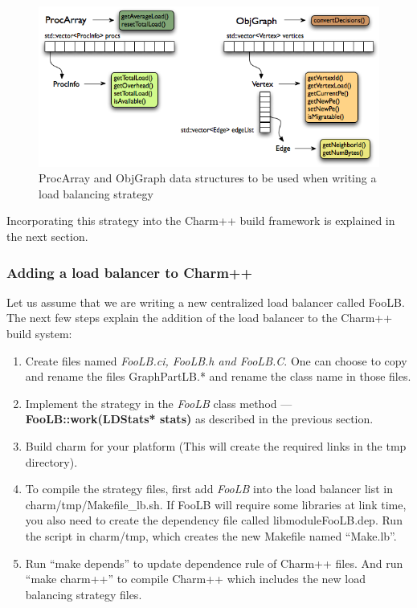 \begin{figure}[h]
\centering
\includegraphics[width=6.0in]{fig/ckgraph}
\caption{ProcArray and ObjGraph data structures to be used when writing a load
balancing strategy}
\label{fig:ckgraph}
\end{figure}

Incorporating this strategy into the Charm++ build framework is explained in
the next section.

\subsubsection{Adding a load balancer to Charm++}

Let us assume that we are writing a new centralized load balancer called FooLB.
The next few steps explain the addition of the load balancer to the Charm++
build system:

\begin{enumerate}
\item Create files named {\em FooLB.ci, FooLB.h and FooLB.C}. One can choose to
copy and rename the files GraphPartLB.* and rename the class name in those
files.

\item Implement the strategy in the {\em FooLB} class method --- {\bf
FooLB::work(LDStats* stats)} as described in the previous section.

\item Build charm for your platform (This will create the required links in the
tmp directory).

\item To compile the strategy files, first add {\em FooLB} into the load
balancer list in charm/tmp/Makefile\_lb.sh. If FooLB will require some
libraries at link time, you also need to create the dependency file called
libmoduleFooLB.dep. Run the script in charm/tmp, which creates the new Makefile
named ``Make.lb''.

\item Run ``make depends'' to update dependence rule of Charm++ files.  And run
``make charm++'' to compile Charm++ which includes the new load balancing
strategy files.
\end{enumerate}


